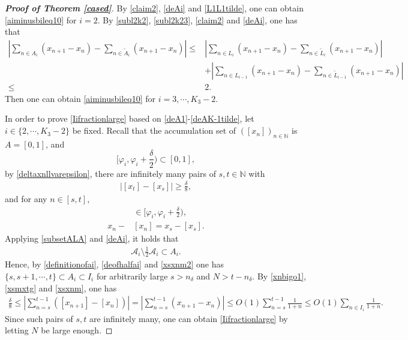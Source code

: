\documentclass[12pt]{amsart}
\newcommand{\abs}[1]{\left\lvert #1 \right\rvert}
\theoremstyle{plain}
\theoremstyle{definition}
\begin{document}
\begin{proof}[\textbf{Proof of Theorem \ref{cased}}]
By \eqref{claim2}, \eqref{deAi} and \eqref{L1L1tilde}, one can obtain \eqref{aiminusbileq10} for $i=2$.
By \eqref{subl2k2}, \eqref{subl2k23}, \eqref{claim2} and \eqref{deAi}, one has that 
\begin{align}
\abs{\sum_{n\in A_i}(x_{n+1}-x_n)-\sum_{n\in\tilde{A}_i}(x_{n+1}-x_n)}\leq& \abs{\sum_{n\in L_i}(x_{n+1}-x_n)-\sum_{n\in \tilde{L}_i}(x_{n+1}-x_n)}\nonumber\\
&+\abs{\sum_{n\in L_{i-1}}(x_{n+1}-x_n)-\sum_{n\in \tilde{L}_{i-1}}(x_{n+1}-x_n)}\nonumber\\
\leq &2.\nonumber
\end{align}
Then one can obtain \eqref{aiminusbileq10} for $i=3,\cdots,K_3-2$. 

In order to prove \eqref{Iifractionlarge} based on \eqref{deA1}-\eqref{deAK-1tilde}, let $i\in\{2,\cdots,K_3-2\}$ be fixed. 
Recall that the accumulation set of $([x_n])_{n\in\mathbb{N}}$ is $A=[0,1]$, and 
$$\Big[\varphi_i,\varphi_{i}+\frac{\delta}{2}\Big)\subset [0,1],$$ 
by \eqref{deltaxnllvarepsilon},
 there are infinitely many pairs of $s,t\in\mathbb{N}$ with
\begin{align}
\abs{\left[x_t\right]-\left[x_s\right]}\geq \frac{\delta}{8},\label{xsmxtg}
\end{align}
and for any $n\in [s,t]$, 
\begin{align}
	[x_n]&\in \Big[\varphi_i,\varphi_{i}+\frac{\delta}{2}\Big),\label{xsxnm2}\\
	x_n-&[x_n]=x_s-[x_s].\label{xsxnm}
\end{align}
Applying \eqref{subsetALA} and \eqref{deAi}, it holds that
\begin{align}
\mathcal{A}_i\setminus \frac{1}{2}\mathcal{A}_i\subset A_i.\nonumber
\end{align} Hence, by \eqref{definitionofai}, \eqref{deofhalfai} and \eqref{xsxnm2} one has
$\{s,s+1,\cdots,t\}\subset A_i\subset I_i$ for arbitrarily large $s>n_\delta$ and $N>t-n_\delta$.
By \eqref{xnbigo1}, \eqref{xsmxtg} and \eqref{xsxnm}, one has 
\begin{align}
\frac{\delta}{8}\leq \abs{\sum_{n=s}^{t-1}(\left[x_{n+1}\right]-\left[x_n\right])}= \abs{\sum_{n=s}^{t-1}(x_{n+1}-x_n)}\leq O(1)\sum_{n=s}^{t-1}\frac{1}{1+n}\leq O(1)\sum_{n\in I_i}\frac{1}{1+n}.\nonumber
\end{align}
Since such pairs of $s,t$ are infinitely many,  one can obtain \eqref{Iifractionlarge} by letting $N$ be large enough.


\end{proof}
\end{document}
